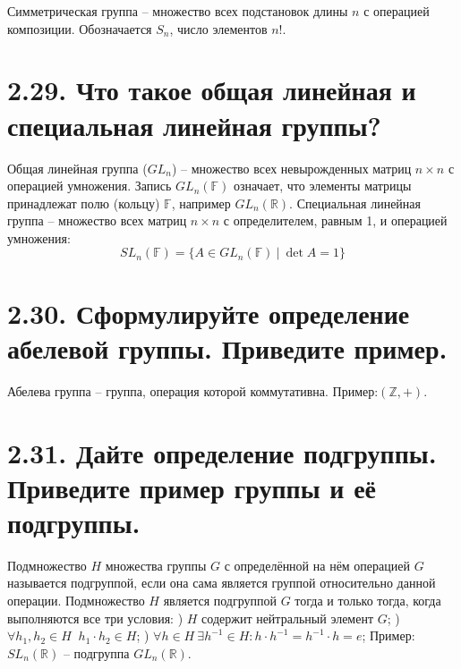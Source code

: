 \documentclass{article}
\begin{document}
Симметрическая группа -- множество всех подстановок длины $n$ с операцией композиции. Обозначается $S_n$, число элементов $n!$.

\section*{\LARGE 2.29. Что такое общая линейная и специальная линейная группы?  }

Общая линейная группа ($GL_n$) -- множество всех невырожденных матриц $n \times n$ с операцией умножения. Запись $GL_n(\mathbb{F})$ означает, что элементы матрицы принадлежат полю (кольцу) $\mathbb{F}$, например $GL_n(\mathbb{R})$.
\newline Специальная линейная группа -- множество всех матриц $n \times n$ с определителем, равным 1, и операцией умножения:
$$
SL_n(\mathbb{F}) = \{A \in GL_n(\mathbb{F}) \:|\: \det{A} = 1\}
$$

\section*{\LARGE 2.30. Сформулируйте определение абелевой группы. Приведите пример. }

Абелева группа -- группа, операция которой коммутативна. Пример:$(\mathbb{Z}, +)$.

\section*{\LARGE 2.31. Дайте определение подгруппы. Приведите пример группы и её подгруппы.  }

Подмножество $H$ множества группы $G$ с определённой на нём операцией $G$ называется подгруппой, если она сама является группой относительно данной операции. 
\newline Подмножество $H$ является подгруппой $G$ тогда и только тогда, когда выполняются все три условия:
) $H$ содержит нейтральный элемент $G$;
) $\forall h_1, h_2 \in H \;\; h_1 \cdot h_2 \in H$;
) $\forall h \in H \: \exists h^{-1} \in H : h \cdot h^{-1} = h^{-1} \cdot h = e$;
\newline Пример: $SL_n(\mathbb{R})$ -- подгруппа $GL_n(\mathbb{R})$.
\end{document}
